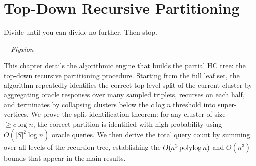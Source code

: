 \chapter{Top-Down Recursive Partitioning}
\label{ch:topdown}

\epigraph{%
  Divide until you can divide no further. Then stop.%
}{\textit{---Flyxion}}

This chapter details the algorithmic engine that builds the partial HC tree: the top-down recursive partitioning procedure. Starting from the full leaf set, the algorithm repeatedly identifies the correct top-level split of the current cluster by aggregating oracle responses over many sampled triplets, recurses on each half, and terminates by collapsing clusters below the $c\log n$ threshold into super-vertices. We prove the split identification theorem: for any cluster of size $\geq c\log n$, the correct partition is identified with high probability using $O(|S|^2 \log n)$ oracle queries. We then derive the total query count by summing over all levels of the recursion tree, establishing the $O(n^2 \operatorname{polylog} n)$ and $O(n^3)$ bounds that appear in the main results.

